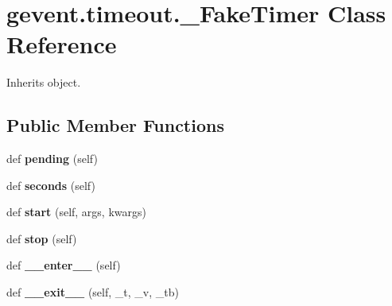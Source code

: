 \hypertarget{classgevent_1_1timeout_1_1___fake_timer}{}\section{gevent.\+timeout.\+\_\+\+Fake\+Timer Class Reference}
\label{classgevent_1_1timeout_1_1___fake_timer}


Inherits object.

\subsection*{Public Member Functions}
\begin{DoxyCompactItemize}
\item 
\mbox{\label{classgevent_1_1timeout_1_1___fake_timer_a8893a88d5ceba04f475faae17738e5c3}} 
def {\bfseries pending} (self)
\item 
\mbox{\label{classgevent_1_1timeout_1_1___fake_timer_aa7810065680512d931a1889e99ec9ebb}} 
def {\bfseries seconds} (self)
\item 
\mbox{\label{classgevent_1_1timeout_1_1___fake_timer_af0469a12380df4d08d5745dc58ecb42f}} 
def {\bfseries start} (self, args, kwargs)
\item 
\mbox{\label{classgevent_1_1timeout_1_1___fake_timer_a932f64258774e441796df80efcdecc5b}} 
def {\bfseries stop} (self)
\item 
\mbox{\label{classgevent_1_1timeout_1_1___fake_timer_acecfe8d5e31838a2375b70ebffeeefd1}} 
def {\bfseries \+\_\+\+\_\+enter\+\_\+\+\_\+} (self)
\item 
\mbox{\label{classgevent_1_1timeout_1_1___fake_timer_a2094f831d3f5fd67b58fc3bbd44c5459}} 
def {\bfseries \+\_\+\+\_\+exit\+\_\+\+\_\+} (self, \+\_\+t, \+\_\+v, \+\_\+tb)
\end{DoxyCompactItemize}
